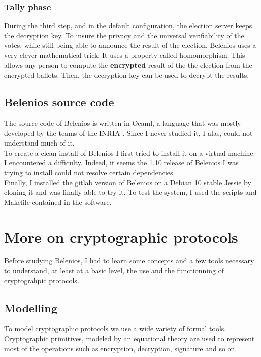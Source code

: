 \documentclass[12pt, a4paper]{report}
\begin{document}
\subsubsection{Tally phase}

During the third step, and in the default configuration, the election server keeps the decryption key. To insure the privacy and the universal verifiability of the votes, while still being able to announce the result of the election, Belenios uses a very clever mathematical trick: It uses a property called homomorphism. This allows any person to compute the \textbf{encrypted} result of the the election from the encrypted ballots. Then, the decryption key can be used to decrypt the results.
 
\subsection{Belenios source code}

The source code of Belenios is written in Ocaml, a language that was mostly developed by the teams of the INRIA . Since I never studied it, I alas, could not understand much of it.\\ 

To create a clean install of Belenios I first tried to install it on a virtual machine. I encountered a difficulty. Indeed, it seems the 1.10 release of Belenios I was trying to install could not resolve certain dependencies.\\

Finally, I installed the gitlab version of Belenios on a Debian 10 stable Jessie by cloning it and was finally able to try it. To test the system, I used the scripts and Makefile contained in the software.



\section{More on cryptographic protocols}

Before studying Belenios, I had to learn some concepts and a few tools necessary to understand, at least at a basic level, the use and the functionning of cryptograhpic protocols. 

\subsection{Modelling}

To model cryptographic protocols we use a wide variety of formal tools.
Cryptographic primitives, modeled by an equational theory are used to represent most of the operations such as encryption, decryption, signature and so on.
\end{document}

